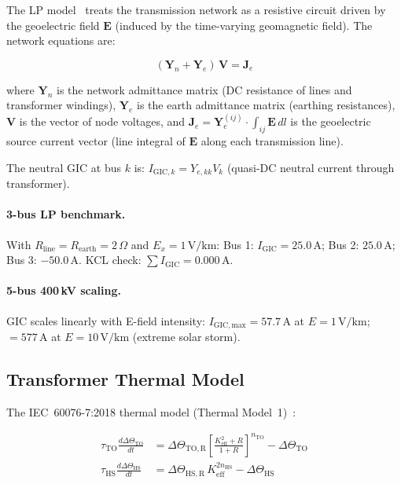 \documentclass[11pt, a4paper]{article}
\newcommand{\cmark}{\ding{51}}
\begin{document}
The LP model~\cite{Lehtinen1985} treats the transmission network as a
resistive circuit driven by the geoelectric field $\mathbf{E}$
(induced by the time-varying geomagnetic field). The network equations are:

\begin{equation}
  (\mathbf{Y}_n + \mathbf{Y}_e)\,\mathbf{V} = \mathbf{J}_e
  \label{eq:lp}
\end{equation}

\noindent where $\mathbf{Y}_n$ is the network admittance matrix
(DC resistance of lines and transformer windings),
$\mathbf{Y}_e$ is the earth admittance matrix (earthing resistances),
$\mathbf{V}$ is the vector of node voltages,
and $\mathbf{J}_e = \mathbf{Y}_e^{(ij)} \cdot \int_{ij} \mathbf{E}\,dl$
is the geoelectric source current vector (line integral of $\mathbf{E}$
along each transmission line).

The neutral GIC at bus $k$ is:
$I_{\mathrm{GIC},k} = Y_{e,kk} V_k$ (quasi-DC neutral current through transformer).

\paragraph{3-bus LP benchmark.}
With $R_{\mathrm{line}} = R_{\mathrm{earth}} = 2\,\Omega$ and
$E_x = 1\,\text{V/km}$:
Bus 1: $I_{\mathrm{GIC}} = 25.0\,\text{A}$;
Bus 2: $25.0\,\text{A}$; Bus 3: $-50.0\,\text{A}$.
KCL check: $\sum I_{\mathrm{GIC}} = 0.000\,\text{A}$. \cmark

\paragraph{5-bus 400\,kV scaling.}
GIC scales linearly with E-field intensity:
$I_{\mathrm{GIC,max}} = 57.7\,\text{A}$ at $E = 1\,\text{V/km}$;
$= 577\,\text{A}$ at $E = 10\,\text{V/km}$ (extreme solar storm).

\subsection{Transformer Thermal Model}

The IEC~60076-7:2018 thermal model (Thermal Model~1)~\cite{IEC60076}:

\begin{align}
  \tau_{\mathrm{TO}}\frac{d\Delta\Theta_{\mathrm{TO}}}{dt}
    &= \Delta\Theta_{\mathrm{TO,R}}
    \left[\frac{K_{\mathrm{eff}}^2 + R}{1 + R}\right]^{n_{\mathrm{TO}}}
    - \Delta\Theta_{\mathrm{TO}}
  \label{eq:topol}\\
  \tau_{\mathrm{HS}}\frac{d\Delta\Theta_{\mathrm{HS}}}{dt}
    &= \Delta\Theta_{\mathrm{HS,R}}\,K_{\mathrm{eff}}^{2n_{\mathrm{HS}}}
    - \Delta\Theta_{\mathrm{HS}}
  \label{eq:hotspot}
\end{align}
\end{document}
